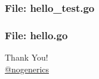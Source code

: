 \documentclass[aspectratio=169]{beamer}
\begin{document}
\begin{frame}[fragile]
  \frametitle{File: hello\_test.go}

  
  
\end{frame}


\begin{frame}[fragile]
  \frametitle{File: hello.go}

  
  
\end{frame}


\begin{frame}%
\begin{center}
{\huge Thank You!}\\[1cm]
{\large \href{https://twitter.com/nogenerics}{@nogenerics}}
\end{center}
\end{frame}
\end{document}
